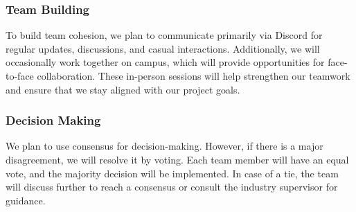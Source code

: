 \documentclass{article}
\begin{document}
\subsubsection*{Team Building}

To build team cohesion, we plan to communicate primarily via Discord for regular updates, discussions, 
and casual interactions. Additionally, we will occasionally work together on campus, which will provide 
opportunities for face-to-face collaboration. These in-person sessions will help strengthen our teamwork 
and ensure that we stay aligned with our project goals.

\subsubsection*{Decision Making} 

We plan to use consensus for decision-making. However, if there is a major disagreement, we will resolve it by voting. Each team member will have an equal vote, and the majority decision will be implemented. In case of a tie, the team will discuss further to reach a consensus or consult the industry supervisor for guidance.
\end{document}
